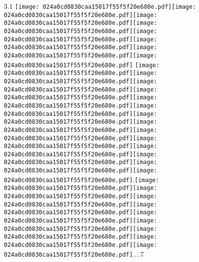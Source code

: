 \documentclass{article}
\newcommand{\origpg}[2]{\texttt{[image: 024a0cd0830caa15017f55f5f20e680e.pdf]}}
\begin{document}
{\vspace{0.626pt}\hspace{36.161pt}3.1 \origpg2{145.74pt 567.97pt 156.5pt 584.11pt}\hspace{-0.161pt}\origpg2{156.34pt 567.97pt 163.4pt 584.11pt}\origpg2{163.33pt 567.97pt 171.4pt 584.11pt}\origpg2{171.5pt 567.97pt 179.57pt 584.11pt}\origpg2{179.67pt 567.97pt 186.83pt 584.11pt}\hspace{-0.178pt}\origpg2{186.65pt 567.97pt 195.29pt 584.11pt}\origpg2{195.29pt 567.97pt 203.92pt 584.11pt}\origpg2{203.99pt 567.97pt 211.16pt 584.11pt} \origpg2{215.06pt 567.97pt 223.7pt 584.11pt}\hspace{-0.21pt}\origpg2{223.49pt 567.97pt 231.56pt 584.11pt}\origpg2{231.65pt 567.97pt 239.72pt 584.11pt}\hspace{-0.113pt}\origpg2{239.61pt 567.97pt 246.23pt 584.11pt}\hspace{-0.113pt}\origpg2{86.5mm 567.97pt 254.19pt 584.11pt}\origpg2{254.28pt 567.97pt 261.45pt 584.11pt}\origpg2{261.5pt 567.97pt 271.71pt 584.11pt}\origpg2{271.62pt 567.97pt 281.83pt 584.11pt}\origpg2{281.74pt 567.97pt 292.58pt 584.11pt}\hspace{0.231pt}\origpg2{292.81pt 567.97pt 308.95pt 584.11pt}\hspace{-0.242pt}\origpg2{108.5mm 567.97pt 324.85pt 584.11pt}\origpg2{324.85pt 567.97pt 340.99pt 584.11pt}\origpg2{340.99pt 567.97pt 357.13pt 584.11pt}\hspace{-0.242pt}\origpg2{356.89pt 567.97pt 373.03pt 584.11pt}.\origpg2{377.15pt 567.97pt 393.29pt 584.11pt}\origpg2{393.29pt 567.97pt 409.43pt 584.11pt}\hspace{-0.242pt}\origpg2{409.19pt 567.97pt 425.33pt 584.11pt}\origpg2{425.33pt 567.97pt 441.47pt 584.11pt}\origpg2{441.47pt 567.97pt 457.61pt 584.11pt}\hspace{-0.242pt}\origpg2{457.37pt 567.97pt 473.51pt 584.11pt}\origpg2{473.51pt 567.97pt 489.65pt 584.11pt}\origpg2{489.65pt 567.97pt 505.79pt 584.11pt}\hspace{-0.242pt}\origpg2{505.55pt 567.97pt 521.69pt 584.11pt}....7 

}
\end{document}
